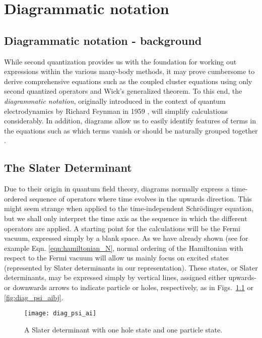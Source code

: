 
\chapter{Diagrammatic notation} %

\label{Chapter3} %



\section{Diagrammatic notation - background}

While second quantization provides us with the foundation for working
out expressions within the various many-body methods, it may prove
cumbersome to derive comprehensive equations such as the coupled
cluster equations using only second quantized operators and Wick's
generalized theorem. To this end, the \emph{diagrammatic notation},
originally introduced in the context of  quantum electrodynamics by Richard Feynman
in 1959 \cite[p.1]{ShavittBartlett2009}, will simplify calculations
considerably. In addition, diagrams allow us to easily
identify features of terms in the equations such as which terms vanish
or should be naturally grouped together \cite{ShavittBartlett2009}.

\section{The Slater Determinant}

Due to their origin in quantum field theory, diagrams normally express
a time-ordered sequence of operators where time evolves in the upwards
direction. This might seem strange when applied to the
time-independent Schrödinger equation, but we shall only interpret the
time axis as the sequence in which the different operators are
applied. A starting point for the calculations will be the Fermi
vacuum, expressed simply by a blank space. As we have already shown
(see for example Eqn. \ref{eqn:hamiltonian_N}, normal ordering of the Hamiltonian with respect to the Fermi
vacuum will allow us mainly focus on excited states (represented by
Slater determinants in our representation). These states, or Slater determinants, may be
expressed simply by vertical lines, assigned either upwards- or
downwards arrows to indicate particle or holes, respectively, as in
Figs.~\ref{fig:diag_psi_ai} or \ref{fig:diag_psi_aibj}.
\begin{figure}[p]
    \centering
    \texttt{[image: diag\_psi\_ai]}
    \caption{A Slater determinant with one hole state and one particle state.}
    \label{fig:diag_psi_ai}
\end{figure}

